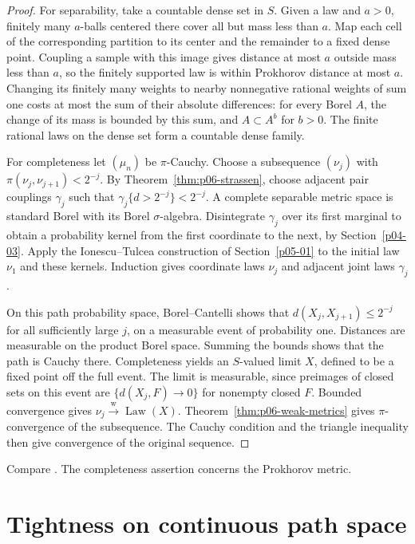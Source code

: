 \documentclass[11pt,oneside,openany]{book}
\DeclareMathOperator{\Law}{Law}
\newcommand{\weakto}{\xrightarrow{\mathrm{w}}}
\theoremstyle{plain}
\theoremstyle{definition}
\theoremstyle{remark}
\begin{document}
\begin{proof}
For separability, take a countable dense set in \(S\). Given a law
and \(a>0\), finitely many \(a\)-balls centered there cover
all but mass less than \(a\). Map each cell of the corresponding
partition to its center and the remainder to a fixed dense
point. Coupling a sample with this image gives distance at
most \(a\) outside mass less than \(a\), so the finitely
supported law is within Prokhorov distance at most \(a\).
Changing its finitely many weights to nearby nonnegative rational
weights of sum one costs at most the sum of their absolute
differences: for every Borel \(A\), the change of its mass is
bounded by this sum, and \(A\subset A^b\) for \(b>0\).
The finite rational laws on the dense set form a countable
dense family.

For completeness let \((\mu_n)\) be \(\pi\)-Cauchy. Choose a
subsequence \((\nu_j)\) with \(\pi(\nu_j,\nu_{j+1})<2^{-j}\).
By Theorem~\ref{thm:p06-strassen}, choose adjacent pair couplings
\(\gamma_j\) such that \(\gamma_j\{d>2^{-j}\}<2^{-j}\).
A complete separable metric space is standard Borel with its
Borel \(\sigma\)-algebra. Disintegrate \(\gamma_j\) over its
first marginal to obtain a probability kernel from the first
coordinate to the next, by Section~\ref{p04-03}. Apply the
Ionescu--Tulcea construction of Section~\ref{p05-01} to the
initial law \(\nu_1\) and these kernels. Induction gives coordinate
laws \(\nu_j\) and adjacent joint laws \(\gamma_j\).

On this path probability space, Borel--Cantelli shows that
\(d(X_j,X_{j+1})\leq2^{-j}\) for all sufficiently large \(j\),
on a measurable event of probability one. Distances are measurable
on the product Borel space. Summing the bounds shows that the path
is Cauchy there. Completeness yields an \(S\)-valued limit \(X\),
defined to be a fixed point off the full event. The limit is
measurable, since preimages of closed sets on this event are
\(\{d(X_j,F)\to0\}\) for nonempty closed \(F\).
Bounded convergence gives \(\nu_j\weakto\Law(X)\).
Theorem~\ref{thm:p06-weak-metrics} gives \(\pi\)-convergence of
the subsequence. The Cauchy condition and the triangle inequality
then give convergence of the original sequence.
\end{proof}

Compare \cite[Theorems 6.8--6.9, pp.~72--77]{Billingsley}.
The completeness assertion concerns the Prokhorov metric.

\section{Tightness on continuous path space}
\label{p06-11}
\end{document}
